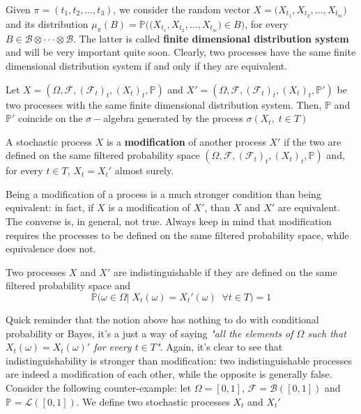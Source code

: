Given $\pi = (t_1,t_2,...,t_3)$, we consider the random vector $X = \big( X_{t_1},X_{t_2},...,X_{t_m}\big)$ and its distribution $\mu_{\pi}(B) = \mathbb{P}\Big( \big( X_{t_1},X_{t_2},...,X_{t_m}\big) \in B\Big)$, for every $B \in \mathcal{B} \otimes \cdot\cdot\cdot \otimes \mathcal{B}$. The latter is called \textbf{finite dimensional distribution system} and will be very important quite soon. Clearly, two processes have the same finite dimensional distribution system if and only if they are equivalent. 

\begin{proposition}
    Let $X = (\Omega, \mathcal{F}, (\mathcal{F}_t)_t, (X_t)_t, \mathbb{P} )$ and $X' = (\Omega, \mathcal{F}, (\mathcal{F}_t)_t, (X_t)_t, \mathbb{P}' )$ be two processes with the same finite dimensional distribution system. Then, $\mathbb{P}$ and $\mathbb{P}'$ coincide on the $\sigma-$algebra generated by the process $\sigma(X_t,\; t\in T)$
\end{proposition}

\begin{definition}
    A stochastic process $X$ is a \textbf{modification} of another process $X'$ if the two are defined on the same filtered probability space $(\Omega, \mathcal{F}, (\mathcal{F}_t)_t, (X_t)_t, \mathbb{P})$ and, for every $t \in T$, $X_t = X_t'$ almost surely.
\end{definition}

Being a modification of a process is a much stronger condition than being equivalent: in fact, if $X$ is a modification of $X'$, than $X$ and $X'$ are equivalent. The converse is, in general, not true. Always keep in mind that modification requires the processes to be defined on the same filtered probability space, while equivalence does not. 

\begin{definition}
    Two processes $X$ and $X'$ are indistinguishable if they are defined on the same filtered probability space and
    \begin{equation}
        \mathbb{P} \Big( \omega \in \Omega \big\vert \; X_t(\omega) = X_t'(\omega) \;\; \forall t \in T \Big) = 1
    \end{equation}
\end{definition}

Quick reminder that the notion above has nothing to do with conditional probability or Bayes, it's a just a way of saying \textit{"all the elements of $\Omega$ such that $X_t(\omega) = X_t(\omega)'$ for every $t \in T$"}. Again, it's clear to see that indistinguishability is stronger than modification: two indistinguishable processes are indeed a modification of each other, while the opposite is generally false. Consider the following counter-example: let $\Omega = [0,1]$, $\mathcal{F} = \mathcal{B}([0,1])$ and $\mathbb{P} = \mathcal{L}([0,1])$. We define two stochastic processes $X_t$ and $X_t'$

